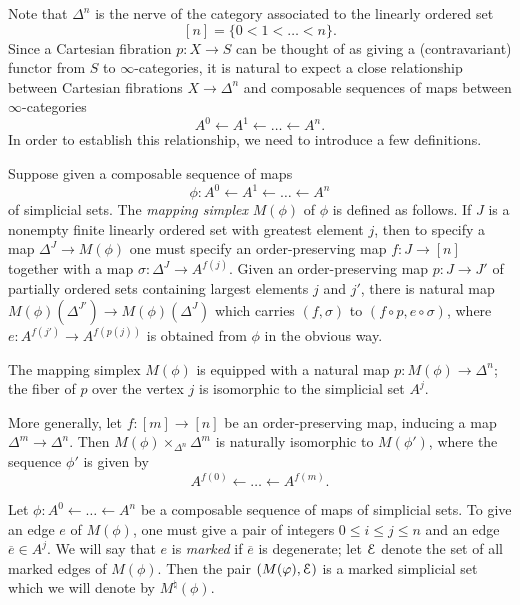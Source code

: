 Note that $\Delta^n$ is the nerve of the category associated to the linearly ordered set
$$[n] = \{ 0 < 1 < \ldots < n\} .$$
Since a Cartesian fibration $p: X \rightarrow S$ can be thought of as giving a (contravariant) functor from $S$ to $\infty$-categories, it is natural to expect a close relationship between Cartesian fibrations $X \rightarrow \Delta^n$ and composable sequences of maps between $\infty$-categories $$ A^0 \leftarrow A^1 \leftarrow \ldots \leftarrow A^n.$$
In order to establish this relationship, we need to introduce a few definitions.

Suppose given a composable sequence of maps
$$ \phi: A^0 \leftarrow A^1 \leftarrow \ldots \leftarrow A^n$$
of simplicial sets. The {\it mapping simplex} $M(\phi)$ of $\phi$
is defined as follows. If $J$ is a nonempty finite linearly
ordered set with greatest element $j$, then to specify a map
$\Delta^J \rightarrow M(\phi)$ one must specify an
order-preserving map $f: J \rightarrow [n]$ together
with a map $\sigma: \Delta^J \rightarrow A^{f(j)}$. Given an order-preserving map
$p: J \rightarrow J'$ of partially ordered sets containing largest elements $j$ and $j'$,
there is natural map $M(\phi)(\Delta^{J'}) \rightarrow M(\phi)(\Delta^J)$ which carries
$(f,\sigma)$ to $(f \circ p, e \circ \sigma)$, where $e: A^{f(j')} \rightarrow A^{f(p(j))}$ is obtained
from $\phi$ in the obvious way.

\begin{remark}\label{megveg}
The mapping simplex $M(\phi)$ is equipped with a natural map $p:
M(\phi) \rightarrow \Delta^n$; the fiber of $p$ over the vertex
$j$ is isomorphic to the simplicial set $A^j$.
\end{remark}

\begin{remark}\label{megvegg}
More generally, let $f: [m] \rightarrow [n]$ be an
order-preserving map, inducing a map $\Delta^m \rightarrow
\Delta^n$. Then $M(\phi) \times_{\Delta^n} \Delta^m$ is naturally
isomorphic to $M(\phi')$, where the sequence $\phi'$ is given by
$$ A^{f(0)} \leftarrow \ldots \leftarrow A^{f(m)}.$$
\end{remark}

\begin{notation}\label{conf2}
Let $\phi: A^0 \leftarrow \ldots \leftarrow A^n$ be a composable sequence of maps of simplicial sets. To give an edge $e$ of $M(\phi)$, one must give a pair of integers
$0 \leq i \leq j \leq n$ and an edge $\overline{e} \in A^{j}$. We will say that
$e$ is {\em marked} if $\overline{e}$ is degenerate; let $\operatorname{\mathcal{E}}$ denote the set of all marked edges of $M(\phi)$. Then the pair $(M(\varphi), \operatorname{\mathcal{E}})$ is a marked simplicial set which we will denote by
$M^{\natural}(\phi)$.
\end{notation}

